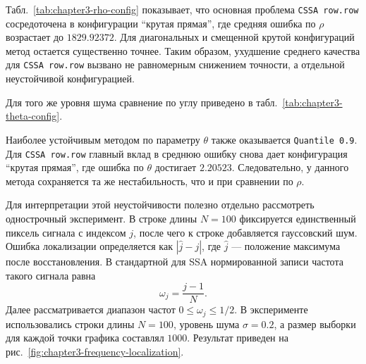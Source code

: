 Табл.~\ref{tab:chapter3-rho-config} показывает, что основная проблема
\texttt{CSSA row.row} сосредоточена в конфигурации ``крутая прямая'', где
средняя ошибка по $\rho$ возрастает до $1829.92372$. Для диагональных и
смещенной крутой конфигураций метод остается существенно точнее. Таким
образом, ухудшение среднего качества для \texttt{CSSA row.row} вызвано не
равномерным снижением точности, а отдельной неустойчивой конфигурацией.

Для того же уровня шума сравнение по углу приведено в
табл.~\ref{tab:chapter3-theta-config}.

\begin{table}[H]
	\centering
	\caption{Средние ошибки оценивания параметра $\theta$ по конфигурациям прямой}
	\label{tab:chapter3-theta-config}
\end{table}

Наиболее устойчивым методом по параметру $\theta$ также оказывается
\texttt{Quantile 0.9}. Для \texttt{CSSA row.row} главный вклад в среднюю
ошибку снова дает конфигурация ``крутая прямая'', где ошибка по $\theta$
достигает $2.20523$. Следовательно, у данного метода сохраняется та же нестабильность, что и при сравнении по $\rho$.

Для интерпретации этой неустойчивости полезно отдельно рассмотреть
однострочный эксперимент. В строке длины $N=100$ фиксируется единственный
пиксель сигнала с индексом $j$, после чего к строке добавляется гауссовский шум. Ошибка
локализации определяется как $|\hat j-j|$, где $\hat j$ --- положение максимума
после восстановления. В стандартной для SSA нормированной записи частота такого
сигнала равна
\[
\omega_j=\frac{j-1}{N}.
\]
Далее рассматривается диапазон частот $0\le\omega_j\le1/2$. В эксперименте
использовались строки длины $N=100$, уровень шума
$\sigma=0.2$, а размер выборки для каждой точки графика составлял $1000$. Результат приведен на
рис.~\ref{fig:chapter3-frequency-localization}.

